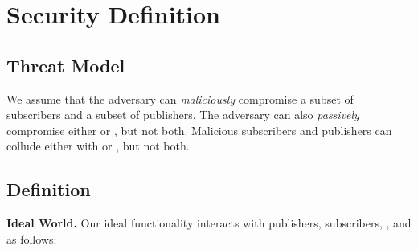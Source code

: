 \section{Security Definition}
\label{sec:definition}


\subsection{Threat Model} We assume that the adversary can \emph{maliciously}
compromise a subset of subscribers and a subset of publishers. The adversary
can also \emph{passively} compromise either \broker or \garbler, but not both.
Malicious subscribers and publishers can collude either with \garbler or
\broker, but not both.

\subsection{Definition}


\noindent\textbf{Ideal World.}
Our ideal functionality \F interacts with publishers, subscribers, \broker, and
\garbler as follows:

